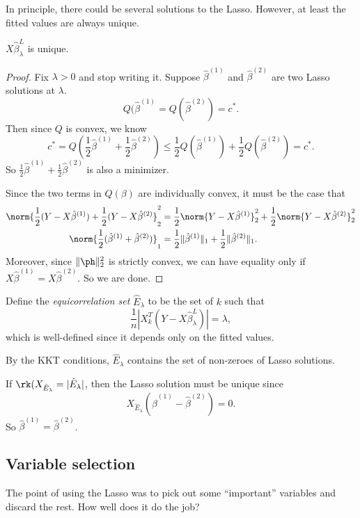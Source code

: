 \documentclass[a4paper]{article}
\begin{document}
In principle, there could be several solutions to the Lasso. However, at least the fitted values are always unique.

\begin{prop}
  $X \hat{\beta}_\lambda^L$ is unique.
\end{prop}
\begin{proof}
  Fix $\lambda > 0$ and stop writing it. Suppose $\hat{\beta}^{(1)}$ and $\hat{\beta}^{(2)}$ are two Lasso solutions at $\lambda$.
  \[
    Q(\hat{\beta}^{(1)} = Q(\hat{\beta}^{(2)}) = c^*.
  \]
 Then since $Q$ is convex, we know
  \[
    c^* = Q\left(\frac{1}{2} \hat{\beta}^{(1)} + \frac{1}{2} \hat{\beta}^{(2)}\right) \leq \frac{1}{2} Q(\hat{\beta}^{(1)}) + \frac{1}{2} Q(\hat{\beta}^{(2)}) = c^*.
  \]
  So $\frac{1}{2} \hat{\beta}^{(1)} + \frac{1}{2} \hat{\beta}^{(2)}$ is also a minimizer.

  Since the two terms in $Q(\beta)$ are individually convex, it must be the case that
  \begin{align*}
    \norm{\frac{1}{2} (Y - X\hat{\beta}^{(1)}) + \frac{1}{2} (Y - X \hat{\beta}^{(2)}}_2^2 &= \frac{1}{2} \norm{Y - X \hat{\beta}^{(1)}}_2^2 + \frac{1}{2} \norm{Y - X \hat{\beta}^{(2)}}_2^2\\
    \norm{\frac{1}{2} (\hat{\beta}^{(1)} + \hat{\beta}^{(2)})}_1 &= \frac{1}{2} \|\hat{\beta}^{(1)}\|_1 + \frac{1}{2} \|\hat{\beta}^{(2)}\|_1.
  \end{align*}
  Moreover, since $\|\ph\|_2^2$ is strictly convex, we can have equality only if $X \hat{\beta}^{(1)} = X \hat{\beta}^{(2)}$. So we are done.
\end{proof}

\begin{defi}
  Define the \emph{equicorrelation set} $\hat{E}_\lambda$ to be the set of $k$ such that
  \[
    \frac{1}{n} |X_k^T(Y - X \hat{\beta}_\lambda^L)| = \lambda,
  \]
  which is well-defined since it depends only on the fitted values.
\end{defi}
By the KKT conditions, $\hat{E}_\lambda$ contains the set of non-zeroes of Lasso solutions.

If $\rk(X_{\hat{E}_\lambda} = |\hat{E}_\lambda|$, then the Lasso solution must be unique since
\[
  X_{\hat{E}_\lambda} (\hat{\beta}^{(1)} - \hat{\beta}^{(2)}) = 0.
\]
So $\hat{\beta}^{(1)} = \hat{\beta}^{(2)}$.

\subsection{Variable selection}
The point of using the Lasso was to pick out some ``important'' variables and discard the rest. How well does it do the job?
\end{document}
